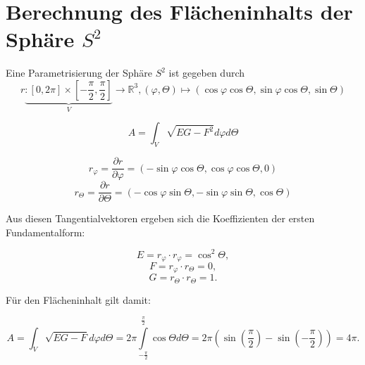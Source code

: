 \documentclass[a4paper,11pt,notitlepage]{report}
\theoremstyle{definition}
\newcommand{\R}{{\ensuremath{\mathbb{R}}}}
\begin{document}
\section{Berechnung des Flächeninhalts der Sphäre $S^2$}
Eine Parametrisierung der Sphäre $S^2$ ist gegeben durch
$$r \underbrace{\colon [0,2 \pi] \times [- \frac{\pi}{2}, \frac{\pi}{2}]}_{V} \rightarrow \R^3, (\varphi, \Theta) \mapsto (\cos \varphi \cos \Theta, \sin \varphi \cos \Theta, \sin \Theta)$$

$$\boxed{A = \int_V{\sqrt{EG - F^2} d \varphi d \Theta}}$$

$$r_\varphi = \frac{\partial r}{\partial \varphi} = (- \sin \varphi \cos \Theta, \cos \varphi \cos \Theta, 0)$$
$$r_\Theta = \frac{\partial r}{\partial \Theta} = (- \cos \varphi \sin \Theta, - \sin \varphi \sin \Theta, \cos \Theta)$$

Aus diesen Tangentialvektoren ergeben sich die Koeffizienten der ersten Fundamentalform:

$$E = r_\varphi \cdot r_\varphi = \cos^2 \Theta,$$
$$F = r_\varphi \cdot r_\Theta = 0,$$
$$G = r_\Theta \cdot r_\Theta = 1.$$

Für den Flächeninhalt gilt damit:

$$A = \int_V{\sqrt{EG-F} d \varphi d \Theta} = 2 \pi \int\limits_{-\frac{\pi}{2}}^{\frac{\pi}{2}}{\cos \Theta d \Theta} = 2 \pi \left(\sin \left(\frac{\pi}{2} \right) - \sin \left(-\frac{\pi}{2}\right) \right)= 4 \pi.$$
\end{document}
